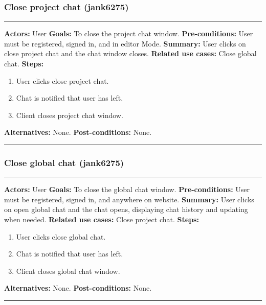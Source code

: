 \documentclass[11pt]{report}
\begin{document}
\subsubsection{Close project chat (jank6275)}
\vspace{2pt}
\hrule
\vspace{8pt}
 \textbf{Actors:} User \newline
\textbf{Goals:} To close the project chat window. \newline
 \textbf{Pre-conditions:} User must be registered, signed in, and in editor Mode.  \newline
 \textbf{Summary:} User clicks on close project chat and the chat window closes. \newline
\textbf{Related use cases:} Close global chat. \newline
\textbf{Steps:} \begin{enumerate}
  \item User clicks close project chat.
  \item Chat is notified that user has left.
  \item Client closes project chat window.
 \end{enumerate}
 \textbf{Alternatives:} None. \newline
 \textbf{Post-conditions:} None. \newline
\vspace{8pt}
\hrule
\newpage

\subsubsection{Close global chat (jank6275)}
\vspace{2pt}
\hrule
\vspace{8pt}
 \textbf{Actors:} User \newline
\textbf{Goals:} To close the global chat window. \newline
 \textbf{Pre-conditions:} User must be registered, signed in, and anywhere on website.  \newline
 \textbf{Summary:} User clicks on open global chat and the chat opens, displaying chat history and updating when needed. \newline
\textbf{Related use cases:} Close project chat. \newline
\textbf{Steps:} \begin{enumerate}
  \item User clicks close global chat.
  \item Chat is notified that user has left.
  \item Client closes global chat window.
 \end{enumerate}
 \textbf{Alternatives:} None. \newline
 \textbf{Post-conditions:} None. \newline
\vspace{8pt}
\hrule
\newpage
\end{document}
